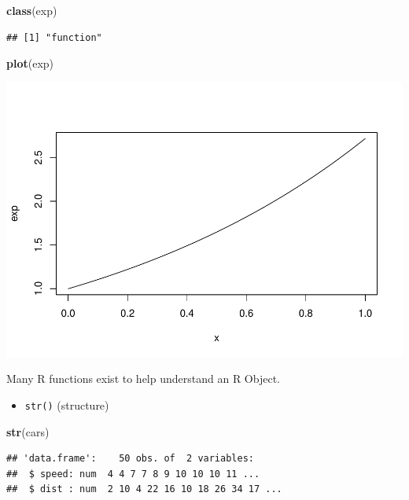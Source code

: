 \documentclass[
]{book}
\newenvironment{Shaded}{\begin{snugshade}}{\end{snugshade}}
\newcommand{\KeywordTok}[1]{\textcolor[rgb]{0.13,0.29,0.53}{\textbf{#1}}}
\newcommand{\NormalTok}[1]{#1}
\providecommand{\tightlist}{%
  \setlength{\itemsep}{0pt}\setlength{\parskip}{0pt}}
\theoremstyle{definition}
\theoremstyle{definition}
\theoremstyle{definition}
\theoremstyle{remark}
\begin{document}
\begin{Shaded}
\begin{Highlighting}[]
\KeywordTok{class}\NormalTok{(exp)}
\end{Highlighting}
\end{Shaded}

\begin{verbatim}
## [1] "function"
\end{verbatim}

\begin{Shaded}
\begin{Highlighting}[]
\KeywordTok{plot}\NormalTok{(exp)}
\end{Highlighting}
\end{Shaded}

\includegraphics{StatisticalMethods_files/figure-latex/unnamed-chunk-26-2.pdf}

Many R functions exist to help understand an R Object.

\begin{itemize}
\tightlist
\item
  \texttt{str()} (structure)
\end{itemize}

\begin{Shaded}
\begin{Highlighting}[]
\KeywordTok{str}\NormalTok{(cars)}
\end{Highlighting}
\end{Shaded}

\begin{verbatim}
## 'data.frame':    50 obs. of  2 variables:
##  $ speed: num  4 4 7 7 8 9 10 10 10 11 ...
##  $ dist : num  2 10 4 22 16 10 18 26 34 17 ...
\end{verbatim}
\end{document}
